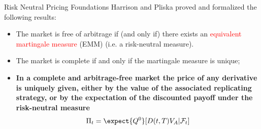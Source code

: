 \documentclass{beamer}
\begin{document}


\begin{frame}{Risk Neutral Pricing Foundations}
	Harrison and Pliska proved and formalized the following results:
	\begin{itemize}
		\item The market is free of arbitrage if (and only if) there exists an \textcolor{red}{equivalent martingale measure} (EMM) (i.e. a risk-neutral measure).
		\item The market is complete if and only if the martingale measure is unique;
		\item \textbf{In a complete and arbitrage-free market the price of any derivative is uniquely given, either by the value of the associated replicating strategy, or by the expectation of the discounted payoff under the risk-neutral measure}
		\begin{equation}
			\Pi_t = \expect{Q^0}[D(t,T)V_A|\mathcal{F}_t]
			\label{eq:risk_neutral_pricing}
		\end{equation}
	\end{itemize}
\end{frame}
\end{document}
